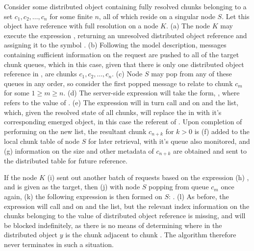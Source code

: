 Consider some distributed object containing fully resolved chunks belonging to
a set \({c_1, c_2, \dots, c_n}\) for some finite \(n\), all of which reside on
a singular node \(S\).
Let this object have reference  with full resolution on a node \(K\).
(\textcolor{dark2-1}{a}) The node \(K\) may execute the expression 
, returning an
unresolved distributed object reference and assigning it to the symbol
.
(\textcolor{dark2-1}{b}) Following the model description, messages containing sufficient information on
the request are pushed to all of the target chunk queues, which in this case,
given that there is only one distributed object reference in , are
chunks \(c_1, c_2, \dots, c_n\).
(\textcolor{dark2-1}{c}) Node \(S\) may pop from any of these queues in any order, so consider the first
popped message to relate to chunk \(c_m\) for some \(1 \geq m \geq n\).
(\textcolor{dark2-1}{d}) The server-side expression will take the form, 
,
where  refers to the value of .
(\textcolor{dark2-1}{e}) The expression will in turn call  and
 on  and the  list,
which, given the resolved state of all chunks, will replace the
 in  with it's corresponding emerged
object, in this case the referent of .
Upon completion of performing  on the new  list, the
resultant chunk \(c_{n+k}\) for \(k > 0 \) is (\textcolor{dark2-1}{f}) added to the local chunk table
of node \(S\) for later retrieval, with it's queue also monitored, and (\textcolor{dark2-1}{g})
information on the size and other metadata of \(c_{n+k}\) are obtained and sent
to the distributed table for future reference.

 If the node \(K\) (\textcolor{dark2-2}{i}) sent out another batch of requests
 based on the expression (\textcolor{dark2-2}{h})
, and
 is given as the target, then (\textcolor{dark2-2}{j}) with node \(S\) popping from queue
\(c_m\) once again, (\textcolor{dark2-2}{k}) the following expression is then formed on \(S\):
.
(\textcolor{dark2-2}{l}) As before, the expression will call  and
 on  and the  list,
but the relevant index information on the chunks belonging to the value of
distributed object reference  is missing, and will be blocked
indefinitely, as there is no means of determining where in the distributed
object \(y\) is the chunk adjacent to chunk .
The algorithm therefore never terminates in such a situation.


